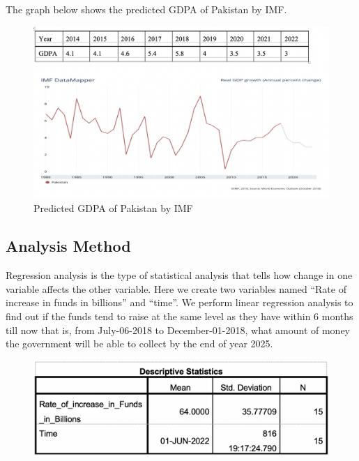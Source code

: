 \documentclass[11pt, journal,letterpaper,compsoc]{IEEEtran}
\begin{document}
The graph below shows the predicted GDPA of Pakistan by IMF. \\
\begin{figure}  [h!]
\includegraphics[width=\linewidth]{images/gdpa-imf}
 \caption{Predicted GDPA of Pakistan by IMF}
\end{figure}

\subsection{Analysis Method}

Regression analysis is the type of statistical analysis that tells how change in one variable affects the other variable. Here we create two variables named “Rate of increase in funds in billions” and “time”.
We perform linear regression analysis to find out if the funds tend to raise at the same level as they have within 6 months till now that is, from July-06-2018 to December-01-2018, what amount of money the government will be able to collect by the end of year 2025.

\begin{figure}  [h!]
\includegraphics[width=\linewidth]{images/descriptive-statistics}
\end{figure}
\end{document}
